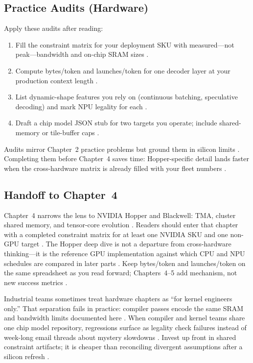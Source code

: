 \subsection{Practice Audits (Hardware)}
\label{sec:ch03_practice}

Apply these audits after reading:
\begin{enumerate}
\item Fill the constraint matrix for your deployment SKU with measured—not peak—bandwidth and on-chip SRAM sizes \citep{memoryfloor2026,nvidia2022hopper}.
\item Compute bytes/token and launches/token for one decoder layer at your production context length \citep{taxbreak2026,patel2025llminference}.
\item List dynamic-shape features you rely on (continuous batching, speculative decoding) and mark NPU legality for each \citep{kwon2023vllm,amd2024xdna}.
\item Draft a chip model JSON stub for two targets you operate; include shared-memory or tile-buffer caps \citep{amd2024aie,nvidia2022hopper}.
\end{enumerate}
Audits mirror Chapter~2 practice problems but ground them in silicon limits \citep{patel2025llminference,memoryfloor2026,dlbook}.
Completing them before Chapter~4 saves time: Hopper-specific detail lands faster when the cross-hardware matrix is already filled with your fleet numbers \citep{nvidia2022hopper,semianalysis2024tma,liu2024deepseekv3}.

\subsection{Handoff to Chapter~4}
\label{sec:ch03_handoff}

Chapter~4 narrows the lens to NVIDIA Hopper and Blackwell: TMA, cluster shared memory, and tensor-core evolution \citep{nvidia2022hopper,semianalysis2024tma}.
Readers should enter that chapter with a completed constraint matrix for at least one NVIDIA SKU and one non-GPU target \citep{memoryfloor2026,amd2024xdna}.
The Hopper deep dive is not a departure from cross-hardware thinking---it is the reference GPU implementation against which CPU and NPU schedules are compared in later parts \citep{patel2025llminference,dlbook}.
Keep bytes/token and launches/token on the same spreadsheet as you read forward; Chapters~4--5 add mechanism, not new success metrics \citep{taxbreak2026,memoryfloor2026,nvidia2022hopper}.

Industrial teams sometimes treat hardware chapters as ``for kernel engineers only.''
That separation fails in practice: compiler passes encode the same SRAM and bandwidth limits documented here \citep{patel2025llminference,dlbook}.
When compiler and kernel teams share one chip model repository, regressions surface as legality check failures instead of week-long email threads about mystery slowdowns \citep{memoryfloor2026,amd2024xdna}.
Invest up front in shared constraint artifacts; it is cheaper than reconciling divergent assumptions after a silicon refresh \citep{nvidia2022hopper,taxbreak2026,liu2024deepseekv3}.

